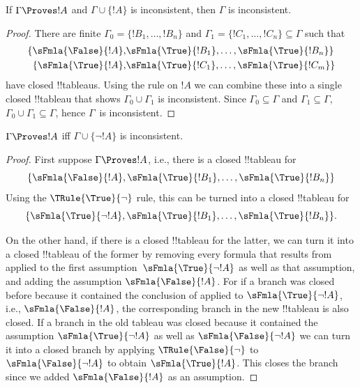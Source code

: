 \begin{prop}
  If $\Gamma \Proves !A$ and $\Gamma \cup \{!A\}$ is
  inconsistent, then $\Gamma$ is inconsistent.
\end{prop}

\begin{proof}
There are finite $\Gamma_0 = \{!B_1, \dots, !B_n\}$ and $\Gamma_1
  =\{!C_1, \dots, !C_n\} \subseteq \Gamma$ such that
  \begin{align*}
    \{\sFmla{\False}{!A}, &
    \sFmla{\True}{!B_1}, \dots, \sFmla{\True}{!B_n}\} \\
    \{\sFmla{\True}{!A}, &
    \sFmla{\True}{!C_1}, \dots, \sFmla{\True}{!C_m}\}
  \end{align*}
  have closed !!{tableau}s.  Using the \Cut{} rule on $!A$ we can
  combine these into a single closed !!{tableau} that shows $\Gamma_0
  \cup \Gamma_1$ is inconsistent.  Since $\Gamma_0
  \subseteq \Gamma$ and $\Gamma_1 \subseteq \Gamma$, $\Gamma_0 \cup
  \Gamma_1 \subseteq \Gamma$, hence $\Gamma$~is inconsistent.
\end{proof}

\begin{prop}
$\Gamma \Proves !A$ iff $\Gamma \cup \{\lnot !A\}$ is inconsistent.
\end{prop}

\begin{proof}
First suppose $\Gamma \Proves !A$, i.e., there is
a closed !!{tableau} for
\[
\{\sFmla{\False}{!A},
\sFmla{\True}{!B_1}, \dots, \sFmla{\True}{!B_n}\}
\]
Using the $\TRule{\True}{\lnot}$ rule, this can be turned into a
closed !!{tableau} for
\[
\{\sFmla{\True}{\lnot !A},
\sFmla{\True}{!B_1}, \dots, \sFmla{\True}{!B_n}\}.
\]

On the other hand, if there is a closed !!{tableau} for the latter, we
can turn it into a closed !!{tableau} of the former by removing every
formula that results from \TRule{\True}{\lnot} applied to the first
assumption~$\sFmla{\True}{\lnot !A}$ as well as that assumption, and
adding the assumption $\sFmla{\False}{!A}$. For if a branch was closed
before because it contained the conclusion of \TRule{\True}{\lnot}
applied to $\sFmla{\True}{\lnot !A}$, i.e., $\sFmla{\False}{!A}$, the
corresponding branch in the new !!{tableau} is also closed. If a
branch in the old tableau was closed because it contained the
assumption $\sFmla{\True}{\lnot !A}$ as well as $\sFmla{\False}{\lnot
  !A}$ we can turn it into a closed branch by applying
$\TRule{\False}{\lnot}$ to $\sFmla{\False}{\lnot !A}$ to obtain
$\sFmla{\True}{!A}$. This closes the branch since we added
$\sFmla{\False}{!A}$ as an assumption.
\end{proof}

